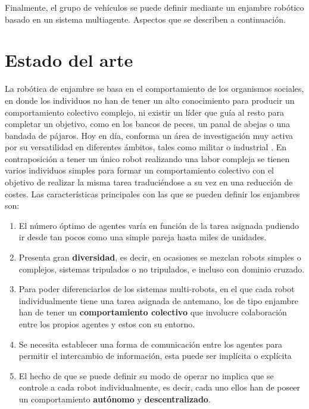 Finalmente, el grupo de vehículos se puede definir mediante un enjambre robótico basado en un sistema multiagente. Aspectos que se describen a continuación.

\section{Estado del arte}\label{Objetives}

La robótica de enjambre se basa en el comportamiento de los organismos sociales, en donde los individuos no han de tener un alto conocimiento para producir un comportamiento colectivo complejo, ni existir un líder que guía al resto para completar un objetivo, como en los bancos de peces, un panal de abejas o una bandada de pájaros.
\newpage
Hoy en día, conforma un área de investigación muy activa por su versatilidad en diferentes ámbitos, tales como militar \cite{Aplicaciones_Militares} o industrial \cite{Aplicacion_2}. En contraposición a tener un único robot realizando una labor compleja se tienen varios individuos simples para formar un comportamiento colectivo con el objetivo de realizar la misma tarea traduciéndose a su vez en una reducción de costes. Las características principales con las que se pueden definir los enjambres son:

\begin{enumerate}
	\item El número óptimo de agentes varía en función de la tarea asignada pudiendo ir desde tan pocos como una simple pareja hasta miles de unidades.
	\item Presenta gran \textbf{diversidad}, es decir, en ocasiones se mezclan robots simples o complejos, sistemas tripulados o no tripulados, e incluso con dominio cruzado.
	\item Para poder diferenciarlos de los sistemas multi-robots, en el que cada robot individualmente tiene una tarea asignada de antemano, los de tipo enjambre han de tener un \textbf{comportamiento colectivo} que involucre colaboración entre los propios agentes y estos con su entorno.
	\item Se necesita establecer una forma de comunicación entre los agentes para permitir el intercambio de información, esta puede ser implícita o explícita
	\item El hecho de que se puede definir su modo de operar no implica que se controle a cada robot individualmente, es decir, cada uno ellos han de poseer un comportamiento \textbf{autónomo} y \textbf{descentralizado}.
\end{enumerate}

